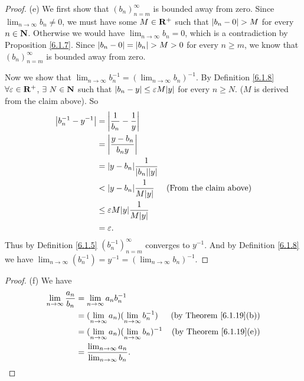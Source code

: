 \begin{proof}{(e)}
    We first show that \((b_n)_{n = m}^\infty\) is bounded away from zero.
    Since \(\lim_{n \to \infty} b_n \neq 0\), we must have some \(M \in \mathbf{R}^+\) such that \(\left\lvert b_n - 0\right\rvert > M\) for every \(n \in \mathbf{N}\).
    Otherwise we would have \(\lim_{n \to \infty} b_n = 0\), which is a contradiction by Proposition \ref{6.1.7}.
    Since \(\left\lvert b_n - 0\right\rvert = \left\lvert b_n\right\rvert > M > 0\) for every \(n \geq m\), we know that \((b_n)_{n = m}^\infty\) is bounded away from zero.

    Now we show that \(\lim_{n \to \infty} b_n^{-1} = (\lim_{n \to \infty} b_n)^{-1}\).
    By Definition \ref{6.1.8} \(\forall \varepsilon \in \mathbf{R}^+\), \(\exists\ N \in \mathbf{N}\) such that \(\abs{b_n - y} \leq \varepsilon M \abs{y}\) for every \(n \geq N\).
    (\(M\) is derived from the claim above).
    So
    \begin{align*}
        \abs{b_n^{-1} - y^{-1}} & = \abs{\frac{1}{b_n} - \frac{1}{y}}                                         \\
                                & = \abs{\frac{y - b_n}{b_n y}}                                               \\
                                & = \abs{y - b_n}\frac{1}{\abs{b_n}\abs{y}}                                   \\
                                & < \abs{y - b_n}\frac{1}{M\abs{y}}           & \text{(From the claim above)} \\
                                & \leq \varepsilon M\abs{y}\frac{1}{M\abs{y}}                                 \\
                                & = \varepsilon.
    \end{align*}
    Thus by Definition \ref{6.1.5} \((b_n^{-1})_{n = m}^\infty\) converges to \(y^{-1}\).
    And by Definition \ref{6.1.8} we have \(\lim_{n \to \infty} (b_n^{-1}) = y^{-1} = (\lim_{n \to \infty} b_n)^{-1}\).
\end{proof}

\begin{proof}{(f)}
    We have
    \begin{align*}
        \lim_{n \to \infty} \frac{a_n}{b_n} & = \lim_{n \to \infty} a_n b_n^{-1}                                                               \\
                                            & = (\lim_{n \to \infty} a_n)(\lim_{n \to \infty} b_n^{-1})  & \text{(by Theorem \ref{6.1.19}(b))} \\
                                            & = (\lim_{n \to \infty} a_n)(\lim_{n \to \infty} b_n)^{-1}  & \text{(by Theorem \ref{6.1.19}(e))} \\
                                            & = \frac{\lim_{n \to \infty} a_n}{\lim_{n \to \infty} b_n}.
    \end{align*}
\end{proof}

